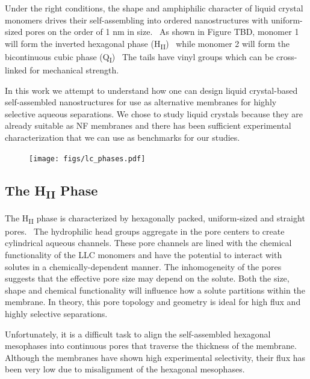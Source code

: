   Under the right conditions, the shape and amphiphilic character of liquid 
  crystal monomers drives their self-assembling into ordered nanostructures with
  uniform-sized pores on the order of 1 nm in size.~\cite{gin_polymerized_2008}
  As shown in Figure TBD, monomer 1 will form the inverted hexagonal phase 
  (H\textsubscript{II})~\cite{smith_ordered_1997} while monomer 2 will form the 
  bicontinuous cubic phase (Q\textsubscript{I})~\cite{carter_glycerol-based_2012}
  The tails have vinyl groups which can be cross-linked for mechanical strength.

  In this work we attempt to understand how one can design liquid crystal-based
  self-assembled nanostructures for use as alternative membranes for highly selective 
  aqueous separations. We chose to study liquid crystals because they are already 
  suitable as NF membranes and there has been sufficient experimental 
  characterization that we can use as benchmarks for our studies.~\cite{gin_polymerized_2001,feng_scalable_2014,feng_thin_2016}
  
  \begin{figure}
  \centering
  \texttt{[image: figs/lc\_phases.pdf]}
  \caption{}\label{fig:lc_phases}
  \end{figure}
   

  \subsection{The H\textsubscript{II} Phase}
   
  The H\textsubscript{II} phase is characterized by hexagonally packed, uniform-sized
  and straight pores.~\cite{smith_ordered_1997} The hydrophilic head groups aggregate
  in the pore centers to create cylindrical aqueous channels. These pore channels are
  lined with the chemical functionality of the LLC monomers and have the potential to
  interact with solutes in a chemically-dependent manner. The inhomogeneity of the 
  pores suggests that the effective pore size may depend on the solute. Both the size,
  shape and chemical functionality will influence how a solute partitions within the 
  membrane. In theory, this pore topology and geometry is ideal for high flux and 
  highly selective separations.
  
  Unfortunately, it is a difficult task to align the self-assembled hexagonal
  mesophases into continuous pores that traverse the thickness of the membrane.
  Although the membranes have shown high experimental selectivity, their flux has been
  very low due to misalignment of the hexagonal mesophases.~\cite{zhou_supported_2005}
  
